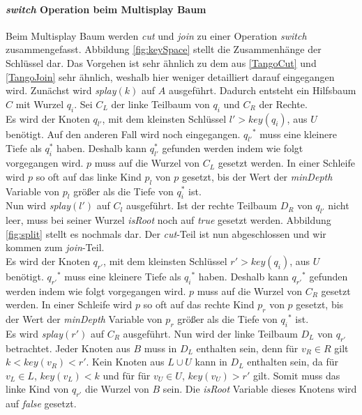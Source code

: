 \documentclass[a4paper,12pt]{article}
\begin{document}
\paragraph{\textit{switch} Operation beim Multisplay Baum}
Beim Multisplay Baum werden \textit{cut} und \textit{join} zu einer Operation \textit{switch} zusammengefasst. Abbildung \ref{fig:keySpace} stellt die Zusammenhänge der Schlüssel dar. Das Vorgehen ist sehr ähnlich zu dem aus \ref{TangoCut} und  \ref{TangoJoin} sehr ähnlich, weshalb hier weniger detailliert darauf eingegangen wird.
Zunächst wird \textit{splay}$\left(k\right)$ auf $A$ ausgeführt. Dadurch entsteht ein Hilfsbaum $C$ mit Wurzel $q_i$. Sei $C_L$ der linke Teilbaum von $q_i$ und $C_R$ der Rechte.\\
 Es wird der Knoten $q_{l'}$, mit dem kleinsten Schlüssel $l' > \textit{key}\left(q_i\right)$, aus $U$ benötigt. Auf den anderen Fall wird noch eingegangen. ${q_{l'}}^*$ muss eine kleinere Tiefe als  $q_i^*$ haben. Deshalb kann $q_{l'}^*$ gefunden werden indem  wie folgt vorgegangen wird. $p$ muss auf die Wurzel von $C_L$ gesetzt werden. In einer Schleife wird $p$ so oft auf das linke Kind $p_l$ von $p$ gesetzt, bis der Wert der \textit{minDepth} Variable von $p_l$ größer als die Tiefe von $q_i^*$  ist.\\
 Nun wird \textit{splay}$\left(l'\right)$ auf $C_l$ ausgeführt. Ist der rechte Teilbaum $D_R$ von $q_{l'}$ nicht leer,  muss bei seiner Wurzel \textit{isRoot} noch auf \textit{true} gesetzt werden. Abbildung \ref{fig:split} stellt es nochmals dar. Der \textit{cut}-Teil ist nun abgeschlossen und wir kommen zum \textit{join}-Teil. \\
 Es wird der Knoten $q_{r'}$, mit dem kleinsten Schlüssel $r' > \textit{key}\left(q_i\right)$, aus $U$ benötigt. ${q_{r'}}^*$ muss eine kleinere Tiefe als  ${q_i}^*$ haben. Deshalb kann ${q_{r'}}^*$ gefunden werden indem  wie folgt vorgegangen wird. $p$ muss auf die Wurzel von $C_R$ gesetzt werden. In einer Schleife wird $p$ so oft auf das rechte Kind $p_r$ von $p$ gesetzt, bis der Wert der \textit{minDepth} Variable von $p_r$ größer als die Tiefe von ${q_i}^*$  ist.\\
 Es wird \textit{splay}$\left(r'\right)$ auf $C_R$ ausgeführt. Nun wird der linke Teilbaum $D_L$ von $q_{r'}$ betrachtet. Jeder Knoten aus $B$ muss in $D_L$ enthalten sein, denn für $v_R \in R$ gilt $k < \mathit{key}\left(v_R\right) < r'$. Kein Knoten aus $L \cup U$ kann in $D_L$ enthalten sein, da für $v_L \in  L$,  $ \mathit{key}\left(v_L\right) < k$ und für  für $v_U \in  U$,  $ \mathit{key}\left(v_U\right) > r'$ gilt. Somit muss das linke Kind von $q_{r'}$ die Wurzel von $B$ sein. Die \textit{isRoot} Variable dieses Knotens wird auf \textit{false} gesetzt.\\
\end{document}
